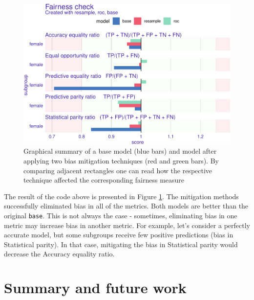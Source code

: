 \begin{Schunk}
\begin{figure}

{\centering \includegraphics[width=0.8\linewidth]{Wisniewski-Biecek_files/figure-latex/mitigation-1} 

}

\caption[Graphical summary of a base model (blue bars) and model after applying two bias mitigation techniques (red and green bars)]{Graphical summary of a base model (blue bars) and model after applying two bias mitigation techniques (red and green bars). By comparing adjacent rectangles one can read how the respective technique affected the corresponding fairness measure}\label{fig:mitigation}
\end{figure}
\end{Schunk}

The result of the code above is presented in Figure
\ref{fig:mitigation}. The mitigation methods successfully eliminated
bias in all of the metrics. Both models are better than the original
\texttt{base}. This is not always the case - sometimes, eliminating bias
in one metric may increase bias in another metric. For example, let's
consider a perfectly accurate model, but some subgroups receive few
positive predictions (bias in Statistical parity). In that case,
mitigating the bias in Statistical parity would decrease the Accuracy
equality ratio.

\hypertarget{summary-and-future-work}{%
\section{Summary and future work}\label{summary-and-future-work}}

